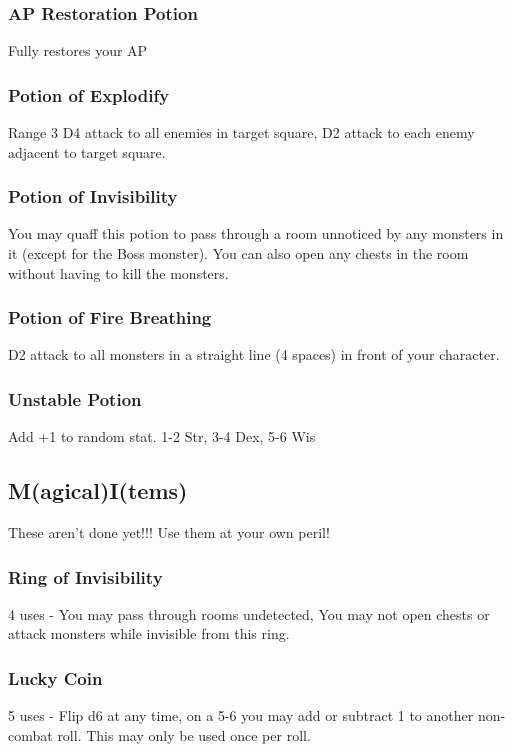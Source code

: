 \documentclass[a6paper,hidelinks]{article}
\begin{document}
\subsubsection{AP Restoration Potion}
Fully restores your AP

\subsubsection{Potion of Explodify}
Range 3 D4 attack to all enemies in target square, D2 attack to each enemy adjacent to target square.

\subsubsection{Potion of Invisibility}

You may quaff this potion to pass through a room unnoticed by any monsters in it (except for the Boss monster). You can also open any chests in the room without having to kill the monsters.

\subsubsection{Potion of Fire Breathing}

D2 attack to all monsters in a straight line (4 spaces) in front of your character.

\subsubsection{Unstable Potion}

Add +1 to random stat. 1-2 Str, 3-4 Dex, 5-6 Wis

\subsection{M(agical)I(tems)}

These aren’t done yet!!! Use them at your own peril!

\subsubsection{Ring of Invisibility}

4 uses - You may pass through rooms undetected, You may not open chests or attack monsters while invisible from this ring.

\subsubsection{Lucky Coin}
5 uses - Flip d6 at any time, on a 5-6 you may add or subtract 1 to another non-combat roll. This may only be used once per roll.
\end{document}
